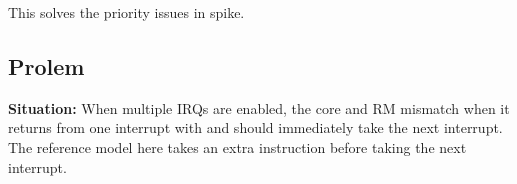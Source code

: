 This solves the priority issues in spike.


\subsection{Prolem}

\textbf{Situation:} When multiple IRQs are enabled, the core and RM mismatch when it returns from one interrupt with  and should immediately take the next interrupt. The reference model here takes an extra instruction before taking the next interrupt.








%
%
%


